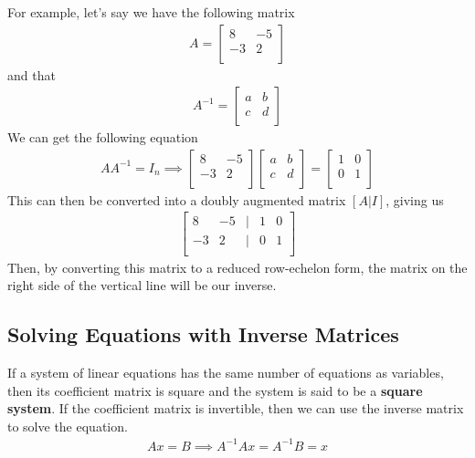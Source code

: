 \documentclass[11pt]{article}
\begin{document}
For example, let's say we have the following matrix
\begin{align*}
    A =
    \begin{bmatrix}
        8 & -5 \\
        -3 & 2 \\
    \end{bmatrix}
\end{align*}
and that 
\begin{align*}
    A^{-1} = 
    \begin{bmatrix}
        a & b \\
        c & d \\
    \end{bmatrix}
\end{align*}
We can get the following equation
\begin{align*}
    AA^{-1} = I_n \implies 
    \begin{bmatrix}
        8 & -5 \\
        -3 & 2 \\
    \end{bmatrix}
    \begin{bmatrix}
        a & b \\
        c & d \\
    \end{bmatrix}
    =
    \begin{bmatrix}
        1 & 0 \\
        0 & 1 \\
    \end{bmatrix}
\end{align*}
This can then be converted into a doubly augmented matrix $[A|I]$, giving us
\begin{align*}
    \begin{bmatrix}
        8 & -5 & | & 1 & 0 \\
        -3 & 2 & | & 0 & 1 \\
    \end{bmatrix}
\end{align*}
Then, by converting this matrix to a reduced row-echelon form, the matrix on the right side of the vertical line will be our inverse.

\subsection{Solving Equations with Inverse Matrices}

If a system of linear equations has the same number of equations as variables, then its coefficient matrix is square and the system is said to be a \textbf{square system}. If the coefficient matrix is invertible, then we can use the inverse matrix to solve the equation.
\begin{align*}
    Ax = B \implies A^{-1}Ax = A^{-1}B = x
\end{align*}
\end{document}
